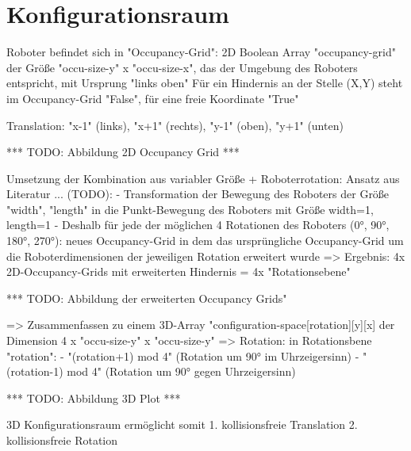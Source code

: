\chapter{Konfigurationsraum}

Roboter befindet sich in "Occupancy-Grid": 2D Boolean Array "occupancy-grid" der Größe "occu-size-y" x "occu-size-x", das der Umgebung des Roboters entspricht, mit Ursprung "links oben"
Für ein Hindernis an der Stelle (X,Y) steht im Occupancy-Grid "False", für eine freie Koordinate "True"

Translation: "x-1" (links), "x+1" (rechts), "y-1" (oben), "y+1" (unten)

*** TODO: Abbildung 2D Occupancy Grid ***

Umsetzung der Kombination aus variabler Größe + Roboterrotation: Ansatz aus Literatur ... (TODO): 
- Transformation der Bewegung des Roboters der Größe "width", "length" in die Punkt-Bewegung des Roboters mit Größe width=1, length=1
- Deshalb für jede der möglichen 4 Rotationen des Roboters (0°, 90°, 180°, 270°): neues Occupancy-Grid in dem das ursprüngliche Occupancy-Grid um die Roboterdimensionen der jeweiligen Rotation erweitert wurde
=> Ergebnis: 4x 2D-Occupancy-Grids mit erweiterten Hindernis = 4x "Rotationsebene"

*** TODO: Abbildung der erweiterten Occupancy Grids"

=> Zusammenfassen zu einem 3D-Array "configuration-space[rotation][y][x] der Dimension 4 x "occu-size-y" x "occu-size-y"
=> Rotation: in Rotationsbene "rotation": 
	- "(rotation+1) mod 4" (Rotation um 90° im Uhrzeigersinn)
	- "(rotation-1) mod 4" (Rotation um 90° gegen Uhrzeigersinn)

*** TODO: Abbildung 3D Plot ***

3D Konfigurationsraum ermöglicht somit 
	1. kollisionsfreie Translation
	2. kollisionsfreie Rotation
